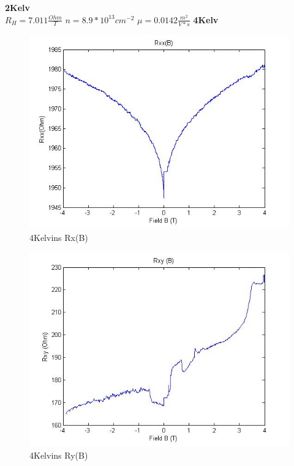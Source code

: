 \documentclass[idxtotoc,hyperref,openany,oneside]{labbook} %
\begin{document}
\normalsize \textbf{2Kelv}\\
$R_H=7.011 \frac{Ohm}{T}$
\newline
$n=8.9*10^{13} cm^{-2}$
\newline
$\mu=0.0142 \frac{m^2}{V*s}$
\newline
\newline
\normalsize \textbf{4Kelv}\\
\begin{figure}[H] %
\begin{center}
\includegraphics[width=1\linewidth]{7464kRx(B).jpg}
\end{center}
\caption{4Kelvins Rx(B)}
\label{fig:fig6}
\end{figure}

\begin{figure}[H] %
\begin{center}
\includegraphics[width=1\linewidth]{7464kRy(B).jpg}
\end{center}
\caption{4Kelvins Ry(B)}
\label{fig:fig7}
\end{figure}
\end{document}
